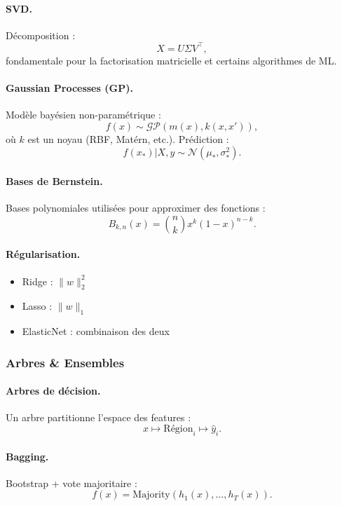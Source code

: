 \documentclass[11pt,a4paper]{article}
\newcommand{\1}{\mathbf{1}}
\begin{document}
\paragraph{SVD.}
Décomposition :
\[
X = U \Sigma V^\top,
\]
fondamentale pour la factorisation matricielle et certains algorithmes de ML.

\paragraph{Gaussian Processes (GP).}
Modèle bayésien non-paramétrique :
\[
f(x) \sim \mathcal{GP}(m(x), k(x,x')),
\]
où $k$ est un noyau (RBF, Matérn, etc.).
Prédiction :
\[
f(x_*) | X,y \sim \mathcal{N}(\mu_*, \sigma_*^2).
\]

\paragraph{Bases de Bernstein.}
Bases polynomiales utilisées pour approximer des fonctions :
\[
B_{k,n}(x) = \binom{n}{k} x^k (1-x)^{n-k}.
\]

\paragraph{Régularisation.}
\begin{itemize}
  \item Ridge : $\|w\|_2^2$
  \item Lasso : $\|w\|_1$
  \item ElasticNet : combinaison des deux
\end{itemize}

\subsubsection{Arbres \& Ensembles}

\paragraph{Arbres de décision.}

Un arbre partitionne l'espace des features :
\[
x \mapsto \text{Région}_i \mapsto \hat y_i.
\]

\paragraph{Bagging.}
Bootstrap + vote majoritaire :
\[
f(x) = \mathrm{Majority}(h_1(x),\dots,h_T(x)).
\]
\end{document}
